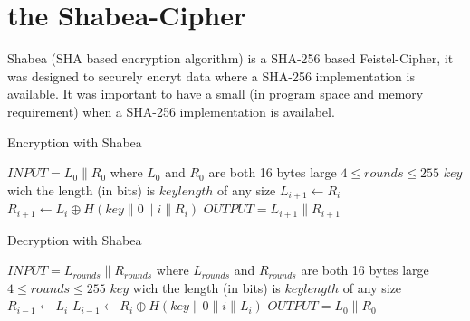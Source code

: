 \section{the Shabea-Cipher}
Shabea (SHA based encryption algorithm) is a SHA-256 based Feistel-Cipher, it was designed to securely encryt data where a SHA-256 implementation is available. It was important to have a small (in program space and memory requirement) when a SHA-256 implementation is availabel.

\begin{algorithm}
\caption{Encryption with Shabea}
\label{algShabeaEnc}
\begin{algorithmic}
\REQUIRE $INPUT = L_0 \parallel R_0$ where $L_0$ and $R_0$ are both 16 bytes large
\REQUIRE $4\leq rounds\leq 255$
\REQUIRE $key$ wich the length (in bits) is $keylength$ of any size
\STATE $L_{i+1} \leftarrow R_i$
\STATE $R_{i+1} \leftarrow L_i \oplus H(key \parallel 0 \parallel i \parallel R_i)$
\ENDFOR
\STATE $OUTPUT = L_{i+1} \parallel R_{i+1}$
\end{algorithmic}
\end{algorithm}

\begin{algorithm}
\caption{Decryption with Shabea}
\label{algShabeaDec}
\begin{algorithmic}
\REQUIRE $INPUT = L_{rounds} \parallel R_{rounds}$ where $L_{rounds}$ and $R_{rounds}$ are both 16 bytes large
\REQUIRE $4\leq rounds\leq 255$
\REQUIRE $key$ wich the length (in bits) is $keylength$ of any size
\STATE $R_{i-1} \leftarrow L_i$
\STATE $L_{i-1} \leftarrow R_i \oplus H(key \parallel 0 \parallel i \parallel L_i)$
\ENDFOR
\STATE $OUTPUT = L_0 \parallel R_0$
\end{algorithmic}
\end{algorithm}